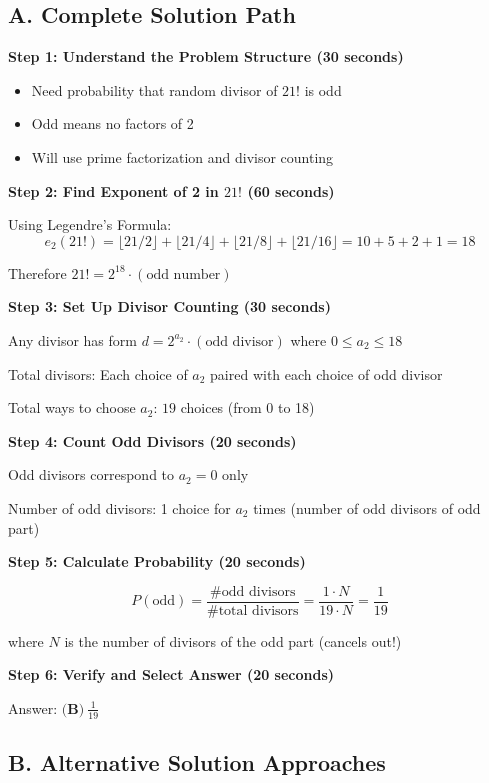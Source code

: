 \documentclass[]{article}
\begin{document}
\begin{solutionbox}
\subsection*{A. Complete Solution Path}

\textbf{Step 1: Understand the Problem Structure (30 seconds)}
\begin{itemize}[leftmargin=*]
    \item Need probability that random divisor of $21!$ is odd
    \item Odd means no factors of 2
    \item Will use prime factorization and divisor counting
\end{itemize}

\textbf{Step 2: Find Exponent of 2 in $21!$ (60 seconds)}

Using Legendre's Formula:
\[e_2(21!) = \lfloor 21/2 \rfloor + \lfloor 21/4 \rfloor + \lfloor 21/8 \rfloor + \lfloor 21/16 \rfloor = 10 + 5 + 2 + 1 = 18\]

Therefore $21! = 2^{18} \cdot (\text{odd number})$

\textbf{Step 3: Set Up Divisor Counting (30 seconds)}

Any divisor has form $d = 2^{a_2} \cdot (\text{odd divisor})$ where $0 \leq a_2 \leq 18$

Total divisors: Each choice of $a_2$ paired with each choice of odd divisor

Total ways to choose $a_2$: $19$ choices (from 0 to 18)

\textbf{Step 4: Count Odd Divisors (20 seconds)}

Odd divisors correspond to $a_2 = 0$ only

Number of odd divisors: 1 choice for $a_2$ times (number of odd divisors of odd part)

\textbf{Step 5: Calculate Probability (20 seconds)}

\[P(\text{odd}) = \frac{\text{\# odd divisors}}{\text{\# total divisors}} = \frac{1 \cdot N}{19 \cdot N} = \frac{1}{19}\]

where $N$ is the number of divisors of the odd part (cancels out!)

\textbf{Step 6: Verify and Select Answer (20 seconds)}

Answer: $\boxed{\textbf{(B)}\ \frac{1}{19}}$

\subsection*{B. Alternative Solution Approaches}


\end{solutionbox}
\end{document}
